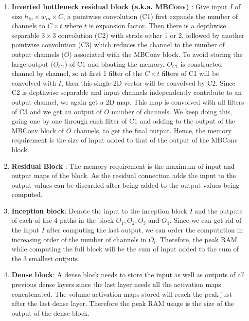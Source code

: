 \documentclass[10pt]{article}
\begin{document}
\begin{enumerate}
  \item \textbf{Inverted bottleneck residual block (a.k.a. MBConv)} :
    Give input $I$ of size $h_{in}\times w_{in} \times C$, a pointwise
    convolution (C1) first expands the number of channels to $C \times
    t$ where $t$ is expansion factor. Then there is a depthwise
    separable $3 \times 3$ convolution (C2) with stride either 1 or 2,
    followed by another pointwise convolution (C3) which reduces the
    channel to the number of output channels ($O$) associated with the
    MBConv block. To avoid storing the large output ($O_{C1}$) of C1
    and bloating the memory, $O_{C1}$ is constructed channel by
    channel, so at first 1 filter of the $C \times t$ filters of C1
    will be convolved with $I$, then this single 2D vector will be
    convolved by C2. Since C2 is depthwise separable and input
    channels independently contribute to an output channel, we again
    get a 2D map. This map is convolved with all filters of C3 and we
    get an output of $O$ number of channels. We keep doing this, going
    one by one through each filter of C1 and adding to the output of
    the MBConv block of $O$ channels, to get the final output. Hence,
    the memory requirement is the size of input added to that of the
    output of the MBConv block.
  
  \item \textbf{Residual Block} : The memory requirement is the
    maximum of input and output maps of the block. As the residual connection adds the input to the output values can be discarded after being added to the output values being computed.
  
  \item \textbf{Inception block}: Denote the input to the inception
    block $I$ and the outputs of each of the $4$ paths in the block
    $O_1, O_2, O_3$ and $O_4$. Since we can get rid of the input $I$
    after computing the last output, we can order the computation in increasing order of the number of channels in $O_i$. Therefore,
    the peak RAM while computing the full block will be the sum of input added to the sum of the 3 smallest outputs.
  
  \item \textbf{Dense block}: A dense block needs to store the input as well as outputs of all previous dense layers since the last layer needs all the activation maps concatenated. The volume activation maps stored will reach the peak just after the last dense layer. Therefore the peak RAM usage is the size of the output of the dense block.
\end{enumerate}
\end{document}
